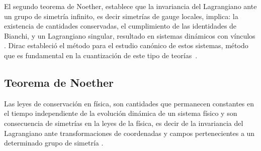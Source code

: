 \documentclass[a4paper,12pt]{article}
\begin{document}
El segundo teorema de Noether, establece que la invariancia del Lagrangiano ante un grupo de simetría infinito, es decir simetrías de gauge locales, implica: la existencia de cantidades conservadas, el cumplimiento de las identidades de Bianchi, y un Lagrangiano singular, resultado en sistemas dinámicos con vínculos \cite{noether,emmy,local}. Dirac estableció el método para el estudio canónico de estos sistemas, método que es fundamental en la cuantización de este tipo de \mbox{teorías \cite{dirac, canoalor}.}
\subsection{Teorema de Noether}
Las leyes de conservación en física, son cantidades que permanecen constantes en el tiempo independiente de la evolución dinámica de un sistema físico y son \mbox{consecuencia} de simetrías en la leyes de la física, es decir de la invariancia del \mbox{Lagrangiano} ante transformaciones de coordenadas y campos pertenecientes a un determinado grupo de simetría \cite{ noether, greiner, emmy}.
\\
\end{document}
